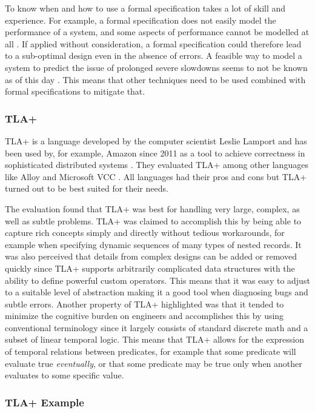 To know when and how to use a formal specification takes a lot of skill and experience. For example, a formal specification does not easily model the performance of a system, and some aspects of performance cannot be modelled at all \cite{AMAZONFORMALSPEC}. If applied without consideration, a formal specification could therefore lead to a sub-optimal design even in the absence of errors. A feasible way to model a system to predict the issue of prolonged severe slowdowns seems to not be known as of this day \cite{AMAZONFORMALSPEC}. This means that other techniques need to be used combined with formal specifications to mitigate that. 

\subsubsection{TLA+}\label{tla}

TLA+ is a language developed by the computer scientist Leslie Lamport \cite{LAMPORTWEB} and has been used by, for example, Amazon since 2011 as a tool to achieve correctness in sophisticated distributed systems \cite{WHYAMAZONTLA}. They evaluated TLA+ among other languages like Alloy \cite{ALLOY} and Microsoft VCC \cite{MSVCC}. All languages had their pros and cons but TLA+ turned out to be best suited for their needs.

The evaluation found that TLA+ was best for handling very large, complex, as well as subtle problems. TLA+ was claimed to accomplish this by being able to capture rich concepts simply and directly without tedious workarounds, for example when specifying dynamic sequences of many types of nested records. It was also perceived that details from complex designs can be added or removed quickly since TLA+ supports arbitrarily complicated data structures with the ability to define powerful custom operators. This means that it was easy to adjust to a suitable level of abstraction making it a good tool when diagnosing bugs and subtle errors. Another property of TLA+ highlighted was that it tended to minimize the cognitive burden on engineers and accomplishes this by using conventional terminology since it largely consists of standard discrete math and a subset of linear temporal logic. This means that TLA+ allows for the expression of temporal relations between predicates, for example that some predicate will evaluate true \textit{eventually}, or that some predicate may be true only when another evaluates to some specific value. 

\subsubsection*{TLA+ Example}


